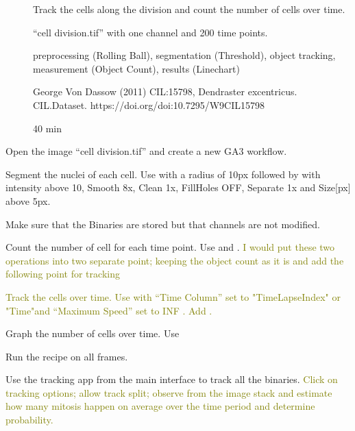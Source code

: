 \pagebreak
{}

\begin{description}
    \item[] Track the cells along the division and count the number of cells over time.
    \item[] “cell division.tif” with one channel and 200 time points.
    \item[] preprocessing (Rolling Ball), segmentation (Threshold), object tracking, measurement (Object Count), results (Linechart)
    \item[] 
        George Von Dassow (2011) CIL:15798, Dendraster excentricus. \\
        CIL.Dataset. https://doi.org/doi:10.7295/W9CIL15798
    \item[] 40 min
    \item[]
\end{description}

\begin{enumerate}
    \item Open the image “cell division.tif” and create a new GA3 workflow.
    \item Segment the nuclei of each cell. \soln Use  with a radius of 10px followed by  with intensity above 10, Smooth 8x, Clean 1x, FillHoles OFF, Separate 1x and Size[px] above 5px. \solnend
    \item Make sure that the Binaries are stored but that channels are not modified.
    \item Count the number of cell for each time point. Use  and .
    \textcolor{olive}{I would put these two operations into two separate point; keeping the object count as it is and add the following point for tracking}
    \textcolor{olive}{\item Track the cells over time. Use  with “Time Column” set to "TimeLapseIndex" or "Time"\soln and “Maximum Speed” set to INF \solnend. Add .}
    \item Graph the number of cells over time. Use 
    \item Run the recipe on all frames. 
    \item Use the tracking app from the main interface to track all the binaries.
    \textcolor{olive}{Click on tracking options; allow track split; observe from the image stack and estimate how many mitosis happen on average over the time period and determine probability.}
\end{enumerate}
